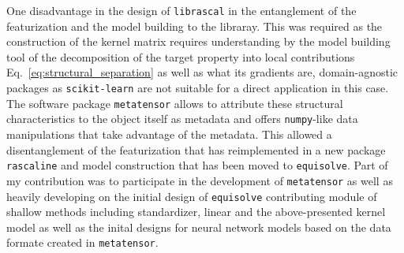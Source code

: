 One disadvantage in the design of \texttt{librascal} in the entanglement of the featurization and the model building to the libraray.
This was required as the construction of the kernel matrix requires understanding by the model building tool of the decomposition of the target property into local contributions Eq.~\ref{eq:structural_separation} as well as what its gradients are, domain-agnostic packages as \texttt{scikit-learn} are not suitable for a direct application in this case.
The software package \texttt{metatensor} allows to attribute these structural characteristics to the object itself as metadata and offers \texttt{numpy}-like data manipulations that take advantage of the metadata.
This allowed a disentanglement of the featurization that has reimplemented in a new package \texttt{rascaline} and model construction that has been moved to \texttt{equisolve}.
Part of my contribution was to participate in the development of \texttt{metatensor} as well as heavily developing on the initial design of \texttt{equisolve} contributing module of shallow methods including standardizer, linear and the above-presented kernel model as well as the inital designs for neural network models based on the data formate created in \texttt{metatensor}.



